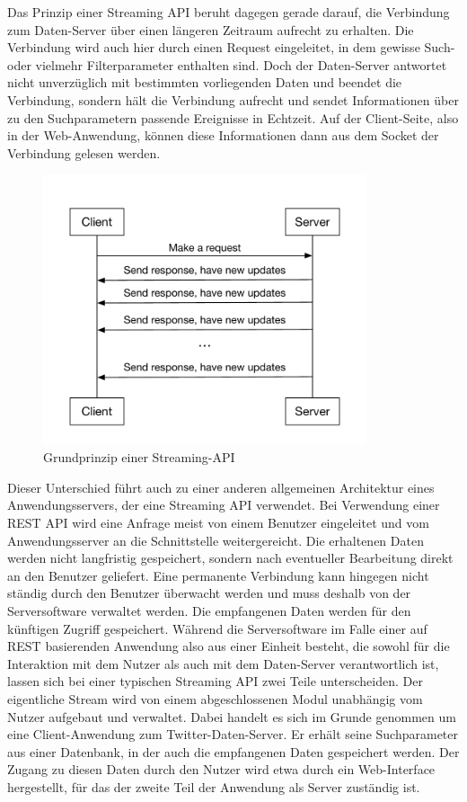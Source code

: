 %
Das Prinzip einer Streaming API beruht dagegen gerade darauf, die Verbindung zum Daten-Server über einen längeren Zeitraum aufrecht zu erhalten. Die Verbindung wird auch hier durch einen Request eingeleitet, in dem gewisse Such- oder vielmehr Filterparameter enthalten sind. Doch der Daten-Server antwortet nicht unverzüglich mit bestimmten vorliegenden Daten und beendet die Verbindung, sondern hält die Verbindung aufrecht und sendet Informationen über zu den Suchparametern passende Ereignisse in Echtzeit. Auf der Client-Seite, also in der Web-Anwendung, können diese Informationen dann aus dem Socket der Verbindung gelesen werden.
%
\begin{figure}[!h]
    \centering
    \includegraphics[width=0.85\textwidth]{Graphics/streaming_api}
    \caption[Grundprinzip einer Streaming-API, in Anlehnung an \cite{quora:api}]{Grundprinzip einer Streaming-API \cite{quora:api}}
   \label{fig:streamapi}
\end{figure}
%
Dieser Unterschied führt auch zu einer anderen allgemeinen Architektur eines Anwendungsservers, der eine Streaming API verwendet. Bei Verwendung einer \acs{REST} API wird eine Anfrage meist von einem Benutzer eingeleitet und vom Anwendungsserver an die Schnittstelle weitergereicht. Die erhaltenen Daten werden nicht langfristig gespeichert, sondern nach eventueller Bearbeitung direkt an den Benutzer geliefert. Eine permanente Verbindung kann hingegen nicht ständig durch den Benutzer überwacht werden und muss deshalb von der Serversoftware verwaltet werden. Die empfangenen Daten werden für den künftigen Zugriff gespeichert. Während die Serversoftware im Falle einer auf REST basierenden Anwendung also aus einer Einheit besteht, die sowohl für die Interaktion mit dem Nutzer als auch mit dem Daten-Server verantwortlich ist, lassen sich bei einer typischen Streaming API zwei Teile unterscheiden. Der eigentliche Stream wird von einem abgeschlossenen Modul unabhängig vom Nutzer aufgebaut und verwaltet. Dabei handelt es sich im Grunde genommen um eine Client-Anwendung zum Twitter-Daten-Server. Er erhält seine Suchparameter aus einer Datenbank, in der auch die empfangenen Daten gespeichert werden. Der Zugang zu diesen Daten durch den Nutzer wird etwa durch ein Web-Interface hergestellt, für das der zweite Teil der Anwendung als Server zuständig ist.
